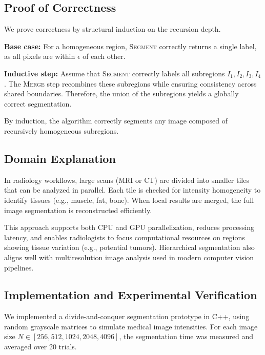\documentclass[conference]{IEEEtran}
\begin{document}
\subsection{Proof of Correctness}
We prove correctness by structural induction on the recursion depth.

\textbf{Base case:} For a homogeneous region, \textsc{Segment} correctly returns a single label, as all pixels are within $\epsilon$ of each other.

\textbf{Inductive step:} Assume that \textsc{Segment} correctly labels all subregions $I_1, I_2, I_3, I_4$. The \textsc{Merge} step recombines these subregions while ensuring consistency across shared boundaries. Therefore, the union of the subregions yields a globally correct segmentation.  

By induction, the algorithm correctly segments any image composed of recursively homogeneous subregions.

\subsection{Domain Explanation}
In radiology workflows, large scans (MRI or CT) are divided into smaller tiles that can be analyzed in parallel. Each tile is checked for intensity homogeneity to identify tissues (e.g., muscle, fat, bone). When local results are merged, the full image segmentation is reconstructed efficiently.  

This approach supports both CPU and GPU parallelization, reduces processing latency, and enables radiologists to focus computational resources on regions showing tissue variation (e.g., potential tumors). Hierarchical segmentation also aligns well with multiresolution image analysis used in modern computer vision pipelines.

\subsection{Implementation and Experimental Verification}
We implemented a divide-and-conquer segmentation prototype in C++, using random grayscale matrices to simulate medical image intensities. For each image size $N \in [256, 512, 1024, 2048, 4096]$, the segmentation time was measured and averaged over 20 trials.  
\end{document}
